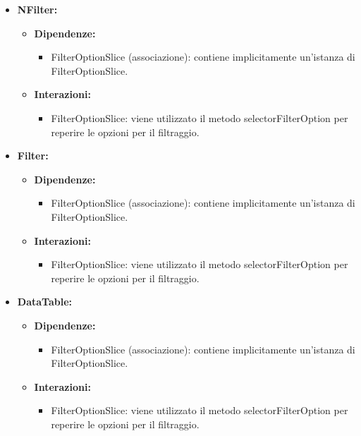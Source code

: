 \begin{itemize}
    \item \textbf{NFilter:}
    \begin{itemize}
        \item \textbf{Dipendenze:}
        \begin{itemize}
            \item FilterOptionSlice (associazione): contiene implicitamente un'istanza di FilterOptionSlice.
        \end{itemize} 
        \item \textbf{Interazioni:}
        \begin{itemize}
            \item FilterOptionSlice: viene utilizzato il metodo selectorFilterOption per reperire le opzioni per il filtraggio.
        \end{itemize} 
    \end{itemize}

    \item \textbf{Filter:}
    \begin{itemize}
        \item \textbf{Dipendenze:}
        \begin{itemize}
            \item FilterOptionSlice (associazione): contiene implicitamente un'istanza di FilterOptionSlice.
        \end{itemize} 
        \item \textbf{Interazioni:}
        \begin{itemize}
            \item FilterOptionSlice: viene utilizzato il metodo selectorFilterOption per reperire le opzioni per il filtraggio.
        \end{itemize} 
    \end{itemize}

    \item \textbf{DataTable:}
    \begin{itemize}
        \item \textbf{Dipendenze:}
        \begin{itemize}
            \item FilterOptionSlice (associazione): contiene implicitamente un'istanza di FilterOptionSlice.
        \end{itemize} 
        \item \textbf{Interazioni:}
        \begin{itemize}
            \item FilterOptionSlice: viene utilizzato il metodo selectorFilterOption per reperire le opzioni per il filtraggio.
        \end{itemize} 
    \end{itemize}


\end{itemize}
